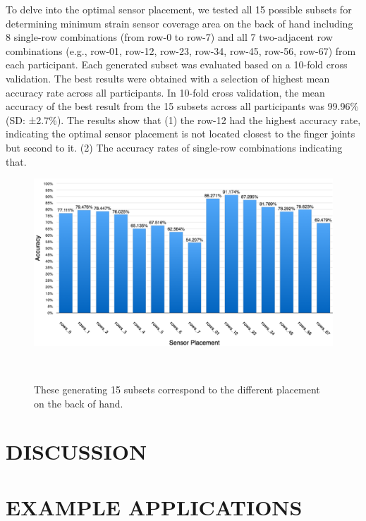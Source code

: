 \documentclass{sigchi}
\begin{document}

To delve into the optimal sensor placement, we tested all 15 possible subsets for determining minimum strain sensor coverage area on the back of hand including 8 single-row combinations (from row-0 to row-7) and all 7 two-adjacent row combinations (e.g., row-01, row-12, row-23, row-34, row-45, row-56, row-67) from each participant.
Each generated subset was evaluated based on a 10-fold cross validation.
The best results were obtained with a selection of highest mean accuracy rate across all participants.
In 10-fold cross validation, the mean accuracy of the best result from the 15 subsets across all participants was 99.96\% (SD: ±2.7\%).
The results show that
(1) the row-12 had the highest accuracy rate, indicating the optimal sensor placement is not located closest to the finger joints but second to it.
(2) The accuracy rates of single-row combinations indicating that.

\begin{figure}
 \begin{center}
  \includegraphics[width=2\columnwidth]{figures/accuracy16Gs.pdf}
  \caption{
    These generating 15 subsets correspond to the different placement on the back of hand.
  }~\label{fig:accuracy16Gs}
  \end{center}
\end{figure}

\section{DISCUSSION}

\section{EXAMPLE APPLICATIONS}
\end{document}
